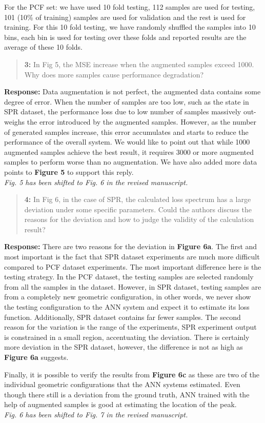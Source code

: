 \documentclass{article}
\begin{document}
	For the PCF set: we have used 10 fold testing, 112 samples are used for testing, 101 (10\% of training) samples are used for validation and the rest is used for training. For this 10 fold testing, we have randomly shuffled the samples into 10 bins, each bin is used for testing over these folds and reported results are the average of these 10 folds.
	
	\begin{quote}
		\textbf{3: }In Fig 5, the MSE increase when the augmented samples exceed 1000. Why does more samples cause performance degradation?
	\end{quote}
	
	\textbf{Response: }Data augmentation is not perfect, the augmented data contains some degree of error. When the number of samples are too low, such as the state in SPR dataset, the performance loss due to low number of samples massively out-weighs the error introduced by the augmented samples. However, as the number of generated samples increase, this error accumulates and starts to reduce the performance of the overall system. We would like to point out that while 1000 augmented samples achieve the best result, it requires 3000 or more augmented samples to perform worse than no augmentation. We have also added more data points to \textbf{Figure 5} to support this reply.\\
	
	\textit{Fig. 5 has been shifted to Fig. 6 in the revised manuscript.}
	
	\begin{quote}
		\textbf{4: }In Fig 6, in the case of SPR, the calculated loss spectrum has a large deviation under some specific parameters. Could the authors discuss the reasons for the deviation and how to judge the validity of the calculation result?
	\end{quote}
	
	\textbf{Response: }There are two reasons for the deviation in \textbf{Figure 6a}. The first and most important is the fact that SPR dataset experiments are much more difficult compared to PCF dataset experiments. The most important difference here is the testing strategy. In the PCF dataset, the testing samples are selected randomly from all the samples in the dataset. However, in SPR dataset, testing samples are from a completely new geometric configuration, in other words, we never show the testing configuration to the ANN system and expect it to estimate its loss function. Additionally, SPR dataset contains far fewer samples. The second reason for the variation is the range of the experiments, SPR experiment output is constrained in a small region, accentuating the deviation. There is certainly more deviation in the SPR dataset, however, the difference is not as high as \textbf{Figure 6a} suggests.
	
	Finally, it is possible to verify the results from \textbf{Figure 6c} as these are two of the individual geometric configurations that the ANN systems estimated. Even though there still is a deviation from the ground truth, ANN trained with the help of augmented samples is good at estimating the location of the peak. \\
	
	\textit{Fig. 6 has been shifted to Fig. 7 in the revised manuscript.}
\end{document}

